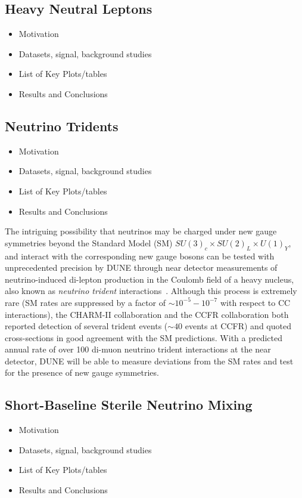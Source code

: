\subsection{Heavy Neutral Leptons}
\begin{itemize}
\item Motivation
\item Datasets, signal, background studies
\item List of Key Plots/tables
\item Results and Conclusions
\end{itemize}

\subsection{Neutrino Tridents}
\begin{itemize}
\item Motivation
\item Datasets, signal, background studies
\item List of Key Plots/tables
\item Results and Conclusions
\end{itemize}
The intriguing possibility that neutrinos may be charged under new gauge symmetries beyond the Standard Model (SM) $SU(3)_c\times SU(2)_L\times U(1)_Y$, and interact with the corresponding new gauge bosons can be tested with unprecedented precision by DUNE through near detector measurements of neutrino-induced di-lepton production in the Coulomb field of a heavy nucleus, also known as {\it neutrino trident} interactions~\cite{Altmannshofer:2014pba}. Although this process is extremely rare (SM rates are suppressed by a factor of $\sim 10^{-5}-10^{-7}$ with respect to CC interactions), the CHARM-II collaboration \cite{Geiregat:1990gz} and the CCFR collaboration \cite{Mishra:1991bv} both reported detection of several trident events ($\sim 40$ events at CCFR) and quoted cross-sections in good agreement with the SM predictions. With a predicted annual rate of over 100 di-muon neutrino trident interactions at the near detector, DUNE will be able to measure deviations from the SM rates and test for the presence of new gauge symmetries.

\subsection{Short-Baseline Sterile Neutrino Mixing}
\begin{itemize}
\item Motivation
\item Datasets, signal, background studies
\item List of Key Plots/tables
\item Results and Conclusions
\end{itemize}